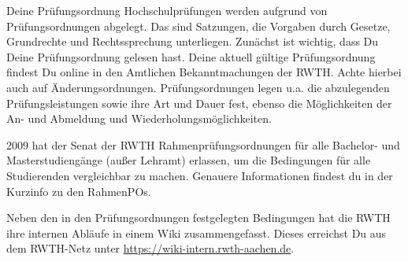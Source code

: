 \begin{artikel}{Deine Prüfungsordnung}
Hochschulprüfungen werden aufgrund von Prüfungsordnungen abgelegt. Das sind Satzungen, die Vorgaben durch Gesetze, Grundrechte und Rechtssprechung unterliegen. Zunächst ist wichtig, dass Du Deine Prüfungsordnung gelesen hast. Deine aktuell gültige Prüfungsordnung findest Du online in den Amtlichen Bekanntmachungen der RWTH. Achte hierbei auch auf Änderungsordnungen. Prüfungsordnungen legen u.a. die abzulegenden Prüfungsleistungen sowie ihre Art und Dauer fest, ebenso die Möglichkeiten der An- und Abmeldung und Wiederholungsmöglichkeiten.

2009 hat der Senat der RWTH Rahmenprüfungsordnungen für alle Bachelor- und Masterstudiengänge (außer Lehramt) erlassen, um die Bedingungen für alle Studierenden vergleichbar zu machen. Genauere Informationen findest du in der Kurzinfo zu den RahmenPOs.

Neben den in den Prüfungsordnungen festgelegten Bedingungen hat die RWTH ihre internen Abläufe in einem Wiki zusammengefasst. Dieses erreichst Du aus dem RWTH-Netz unter \url{https://wiki-intern.rwth-aachen.de}.
\end{artikel}
